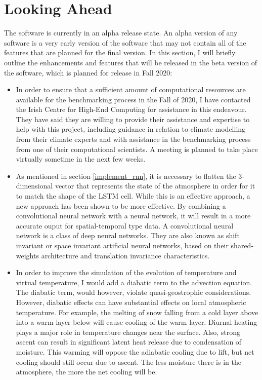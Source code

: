 \section{Looking Ahead}
The software is currently in an alpha release state. An alpha version of any software is a very early version of the software that may not contain all of the features that are planned for the final version\cite{alpha}. In this section, I will briefly outline the enhancements and features that will be released in the beta version of the software, which is planned for release in Fall 2020:

\begin{itemize}
    \item In order to ensure that a sufficient amount of computational resources are available for the benchmarking process in the Fall of 2020, I have contacted the Irish Centre for High-End Computing for assistance in this endeavour. They have said they are willing to provide their assistance and expertise to help with this project, including guidance in relation to climate modelling from their climate experts and with assistance in the benchmarking process from one of their computational scientists. A meeting is planned to take place virtually sometime in the next few weeks.
    \item As mentioned in section \ref{implement_rnn}, it is necessary to flatten the 3-dimensional vector that represents the state of the atmosphere in order for it to match the shape of the LSTM cell. While this is an effective approach, a new approach has been shown to be more effective. By combining a convolutional neural network with a neural network, it will result in a more accurate ouput for spatial-temporal type data. A convolutional neural network is a class of deep neural networks. They are also known as shift invariant or space invariant artificial neural networks, based on their shared-weights architecture and translation invariance characteristics. 
    \item In order to improve the simulation of the evolution of temperature and virtual temperature, I would add a diabatic term to the advection equation. The diabatic term, would however, violate quasi-geostrophic considerations. However, diabatic effects can have substantial effects on local atmospheric temperature. For example, the melting of snow falling from a cold layer above into a warm layer below will cause cooling of the warm layer. Diurnal heating plays a major role in temperature changes near the surface. Also, strong ascent can result in significant latent heat release due to condensation of moisture. This warming will oppose the adiabatic cooling due to lift, but net cooling should still occur due to ascent. The less moisture there is in the atmosphere, the more the net cooling will be\cite{describe_quasi}.
\end{itemize}